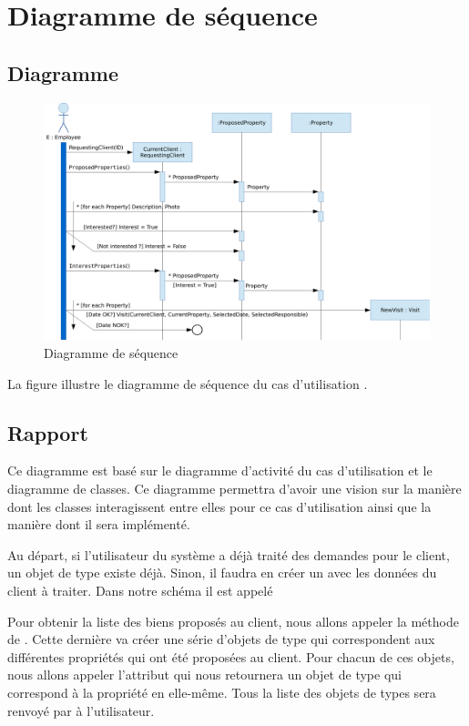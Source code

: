 \chapter{Diagramme de séquence}

\section{Diagramme}

\begin{figure}
  \centering
  \includegraphics[scale=0.67,angle=90]{IMG/id}
  \caption{Diagramme de séquence}
  \label{img_id}
\end{figure}

La figure  illustre le diagramme de séquence du cas d'utilisation \selectedusecase{}.

\section{Rapport}

Ce diagramme est basé sur le diagramme d'activité du cas d'utilisation \selectedusecase{} et le diagramme de classes. Ce diagramme permettra d'avoir une vision sur la manière dont les classes interagissent entre elles pour ce cas d'utilisation ainsi que la manière dont il sera implémenté.

Au départ, si l'utilisateur du système a déjà traité des demandes pour le client, un objet de type  existe déjà. Sinon, il faudra en créer un avec les données du client à traiter. Dans notre schéma il est appelé 

Pour obtenir la liste des biens proposés au client, nous allons appeler la méthode  de . Cette dernière va créer une série d'objets de type  qui correspondent aux différentes propriétés qui ont été proposées au client. Pour chacun de ces objets, nous allons appeler l'attribut  qui nous retournera un objet de type  qui correspond à la propriété en elle-même. Tous la liste des objets de types  sera renvoyé par  à l'utilisateur.

